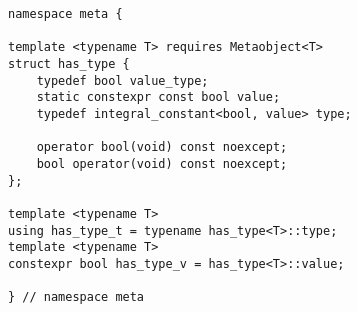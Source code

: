 
\begin{verbatim}
namespace meta {

template <typename T> requires Metaobject<T>
struct has_type {
	typedef bool value_type;
	static constexpr const bool value;
	typedef integral_constant<bool, value> type;

	operator bool(void) const noexcept;
	bool operator(void) const noexcept;
};

template <typename T>
using has_type_t = typename has_type<T>::type;
template <typename T>
constexpr bool has_type_v = has_type<T>::value;

} // namespace meta
\end{verbatim}

